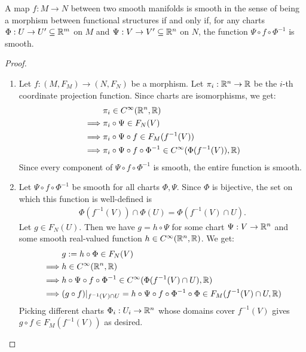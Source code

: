 \begin{importanttheorem}{}{}
	A map $f : M \to N$ between two smooth manifolds is smooth in the sense of being a morphism between functional structures if and only if, for any charts $\Phi : U \to U' \subseteq \mathbb{R}^m$ on $M$ and $\Psi : V \to V' \subseteq \mathbb{R}^n$ on $N$, the function $\Psi \circ f \circ \Phi^{-1}$ is smooth.
\end{importanttheorem}
\begin{proof}
	\begin{enumerate}
		\item[$\Rightarrow$:] Let $f : (M, F_M) \to (N, F_N)$ be a morphism. Let $\pi_i : \mathbb{R}^n \to \mathbb{R}$ be the $i$-th coordinate projection function. Since charts are isomorphisms, we get:
		\begin{align*}
			&\pi_i \in C^\infty(\mathbb{R}^n, \mathbb{R})\\
			\implies &\pi_i \circ \Psi \in F_N(V)\\
			\implies &\pi_i \circ \Psi \circ f \in F_M(f^{-1}(V))\\
			\implies &\pi_i \circ \Psi \circ f \circ \Phi^{-1} \in C^\infty(\Phi(f^{-1}(V)), \mathbb{R})
		\end{align*}
		Since every component of $\Psi \circ f \circ \Phi^{-1}$ is smooth, the entire function is smooth.
		
		
		\item[$\Leftarrow$:] Let $\Psi \circ f \circ \Phi^{-1}$ be smooth for all charts $\Phi, \Psi$. Since $\Phi$ is bijective, the set on which this function is well-defined is 
		\begin{align*}
			\Phi(f^{-1}(V)) \cap \Phi(U) = \Phi(f^{-1}(V) \cap U).
		\end{align*}
		Let $g \in F_N(U)$. Then we have $g = h \circ \Psi$ for some chart $\Psi : V \to \mathbb{R}^n$ and some smooth real-valued function $h \in C^\infty(\mathbb{R}^n, \mathbb{R})$.
		\newpar
		We get:
		\begin{align*}
			&g := h \circ \Phi \in F_N(V)\\
			\implies &h \in C^\infty(\mathbb{R}^n, \mathbb{R})\\
			\implies &h \circ \Psi \circ f \circ \Phi^{-1} \in C^\infty(\Phi(f^{-1}(V) \cap U),\mathbb{R})\\
			\implies &(g \circ f)|_{f^{-1}(V) \cap U} = h \circ \Psi \circ f \circ \Phi^{-1} \circ \Phi \in F_M(f^{-1}(V) \cap U, \mathbb{R})
		\end{align*}
		Picking different charts $\Phi_i : U_i \to \mathbb{R}^n$ whose domains cover $f^{-1}(V)$ gives $g \circ f \in F_M(f^{-1}(V))$ as desired.
	\end{enumerate}
\end{proof}

